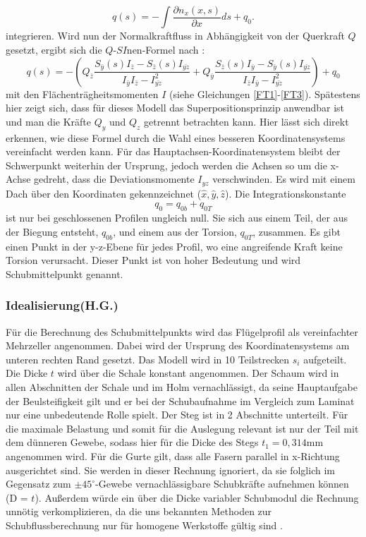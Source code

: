 \begin{equation}
	q(s)=-\int\frac{\partial n_x(x,s)}{\partial x}ds+q_0.
\end{equation}
integrieren. Wird nun der Normalkraftfluss in Abhängigkeit von der Querkraft $Q$ gesetzt, ergibt sich die $Q$-$SI$nen-Formel nach \cite{item15}:
\begin{equation}\label{qs}
	q(s)=-(Q_{\bar{z}}\frac{S_{\bar{y}}(s)I_{\bar{z}}-S_{\bar{z}}(s)I_{\bar{yz}}}{I_{\bar{y}}I_{\bar{z}}-I_{\bar{yz}}^2}+Q_{\bar{y}}\frac{S_{\bar{z}}(s)I_{\bar{y}}-S_{\bar{y}}(s)I_{\bar{yz}}}{I_{\bar{z}}I_{\bar{y}}-I_{\bar{yz}}^2})+q_0
\end{equation}
mit den Flächenträgheitsmomenten $I$ (siehe Gleichungen \ref{FT1}-\ref{FT3}). Spätestens hier zeigt sich, dass für dieses Modell das Superpositionsprinzip anwendbar ist und man die Kräfte $Q_y$ und $Q_z$ getrennt betrachten kann.
Hier lässt sich direkt erkennen, wie diese Formel durch die Wahl eines besseren Koordinatensystems vereinfacht werden kann. Für das Hauptachsen-Koordinatensystem bleibt der Schwerpunkt weiterhin der Ursprung, jedoch werden die Achsen so um die x-Achse gedreht, dass die Deviationsmomente $I_{yz}$ verschwinden. Es wird mit einem Dach über den Koordinaten gekennzeichnet ($\hat{x},\hat{y},\hat{z}$). Die Integrationskonstante
\begin{equation}
	q_{0} = q_{0b}+q_{0T}
\end{equation}
ist nur bei geschlossenen Profilen ungleich null. Sie sich aus einem Teil, der aus der Biegung entsteht, $q_{0b}$, und einem aus der Torsion, $q_{0T}$, zusammen. Es gibt einen Punkt in der y-z-Ebene für jedes Profil, wo eine angreifende Kraft keine Torsion verursacht. Dieser Punkt ist von hoher Bedeutung und wird Schubmittelpunkt genannt.
\subsubsection{Idealisierung(H.G.)}
Für die Berechnung des Schubmittelpunkts wird das Flügelprofil als vereinfachter Mehrzeller angenommen.
Dabei wird der Ursprung des Koordinatensystems am unteren rechten Rand gesetzt. Das Modell wird in 10 Teilstrecken $s_{i}$ aufgeteilt. Die Dicke $t$ wird über die Schale konstant angenommen. Der Schaum wird in allen Abschnitten der Schale und im Holm vernachlässigt, da seine Hauptaufgabe der Beulsteifigkeit gilt und er bei der Schubaufnahme im Vergleich zum Laminat nur eine unbedeutende Rolle spielt. Der Steg ist in 2 Abschnitte unterteilt. Für die maximale Belastung und somit für die Auslegung relevant ist nur der Teil mit dem dünneren Gewebe, sodass hier für die Dicke des Stegs $t_{1}=0,314\mathrm{mm}$ angenommen wird. Für die Gurte gilt, dass alle Fasern parallel in x-Richtung ausgerichtet sind. Sie werden in dieser Rechnung ignoriert, da sie folglich im Gegensatz zum $\pm45^\circ$-Gewebe vernachlässigbare Schubkräfte aufnehmen können (D = $t$). Außerdem würde ein über die Dicke variabler Schubmodul die Rechnung unnötig verkomplizieren, da die uns bekannten Methoden zur Schubflussberechnung nur für homogene Werkstoffe gültig sind \cite{item15}.

